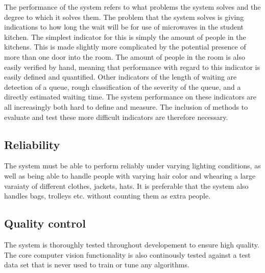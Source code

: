 The performance of the system refers to what problems the system solves and the degree to which it solves them. The problem that the system solves is giving indications to how long the wait will be for use of microwaves in the student kitchen. The simplest indicator for this is simply the amount of people in the kitchens. This is made slightly more complicated by the potential presence of more than one door into the room. The amount of people in the room is also easily verified by hand, meaning that performance with regard to this indicator is easily defined and quantified. Other indicators of the length of waiting are detection of a queue, rough classification of the severity of the queue, and a directly estimated waiting time. The system performance on these indicators are all increasingly both hard to define and measure. The inclusion of methods to evaluate and test these more difficult indicators are therefore necessary.

\subsection{Reliability}
The system must be able to perform reliably under varying lighting conditions, as well as being able to handle people with varying hair color and whearing a large varaiaty of different clothes, jackets, hats. It is preferable that the system also handles bags, trolleys etc. without counting them as extra people. 

\subsection{Quality control}
The system is thoroughly tested throughout developement to ensure high quality. The core computer vision functionality is also continously tested against a test data set that is never used to train or tune any algorithms. 


